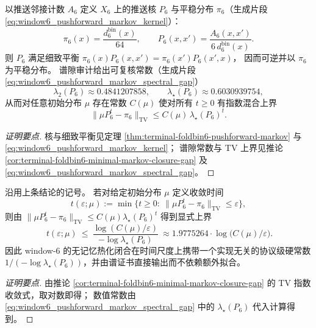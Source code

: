\begin{conclusion}\label{con:xi-window6-p6-minimal-thermalization-closure}
以推送邻接计数 \(A_6\) 定义 \(X_6\) 上的推送核 \(P_6\) 与平稳分布 \(\pi_6\)（生成片段 \eqref{eq:window6_pushforward_markov_kernel}）：
\[
\pi_6(x)=\frac{d^{\mathrm{bin}}_6(x)}{64},\qquad
P_6(x,x')=\frac{A_6(x,x')}{6\,d^{\mathrm{bin}}_6(x)}.
\]
则 \(P_6\) 满足细致平衡
\(
\pi_6(x)P_6(x,x')=\pi_6(x')P_6(x',x)
\)，
因而可逆并以 \(\pi_6\) 为平稳分布。
谱隙审计给出可复核常数（生成片段 \eqref{eq:window6_pushforward_markov_spectral_gap}）
\[
\lambda_2(P_6)\approx 0.4841207858,\qquad
\lambda_\star(P_6)\approx 0.6030939754,
\]
从而对任意初始分布 \(\mu\) 存在常数 \(C(\mu)\) 使对所有 \(t\ge 0\) 有指数混合上界
\[
\|\mu P_6^t-\pi_6\|_{\mathrm{TV}}\le C(\mu)\,\lambda_\star(P_6)^t.
\]
\end{conclusion}
\begin{proof}[证明要点]
核与细致平衡见定理 \ref{thm:terminal-foldbin6-pushforward-markov} 与 \eqref{eq:window6_pushforward_markov_kernel}；
谱隙常数与 TV 上界见推论 \ref{cor:terminal-foldbin6-minimal-markov-closure-gap} 及 \eqref{eq:window6_pushforward_markov_spectral_gap}。
\end{proof}

\begin{conclusion}\label{con:xi-window6-mixing-time-hard-constant}
沿用上条结论的记号。
若对给定初始分布 \(\mu\) 定义收敛时间
\[
t(\varepsilon;\mu):=\min\bigl\{t\ge 0:\ \|\mu P_6^t-\pi_6\|_{\mathrm{TV}}\le \varepsilon\bigr\},
\]
则由 \(\|\mu P_6^t-\pi_6\|_{\mathrm{TV}}\le C(\mu)\lambda_\star(P_6)^t\) 得到显式上界
\[
\boxed{\ t(\varepsilon;\mu)\ \le\ \frac{\log(C(\mu)/\varepsilon)}{-\log\lambda_\star(P_6)}\ }
\approx 1.9775264\cdot \log\!\bigl(C(\mu)/\varepsilon\bigr).
\]
因此 window-\(6\) 的无记忆热化闭合在时间尺度上携带一个实现无关的协议级硬常数 \(1/(-\log\lambda_\star(P_6))\)，并由谱证书直接输出而不依赖额外拟合。
\end{conclusion}
\begin{proof}[证明要点]
由推论 \ref{cor:terminal-foldbin6-minimal-markov-closure-gap} 的 TV 指数收敛式，取对数即得；
数值常数由 \eqref{eq:window6_pushforward_markov_spectral_gap} 中的 \(\lambda_\star(P_6)\) 代入计算得到。
\end{proof}

